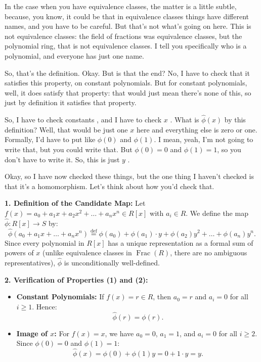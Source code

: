 \begin{proofWrapper}
\begin{speech}[00:10:45 - 00:12:20]
In the case when you have equivalence classes, the matter is a little subtle, because, you know, it could be that in equivalence classes things have different names, and you have to be careful. But that's not what's going on here. This is not equivalence classes: the field of fractions was equivalence classes, but the polynomial ring, that is not equivalence classes. I tell you specifically who is a polynomial, and everyone has just one name.

So, that's the definition. Okay. But is that the end? No, I have to check that it satisfies this property, on constant polynomials. But for constant polynomials, well, it does satisfy that property: that would just mean there's none of this, so just by definition it satisfies that property.

So, I have to check constants , and I have to check $x$ . What is $\hat{\phi}(x)$ by this definition? Well, that would be just one $x$ here and everything else is zero or one. Formally, I'd have to put like $\phi(0)$ and $\phi(1)$. I mean, yeah, I'm not going to write that, but you could write that. But $\phi(0) = 0$ and $\phi(1) = 1$, so you don't have to write it. So, this is just $y$ .

Okay, so I have now checked these things, but the one thing I haven't checked is that it's a homomorphism. Let's think about how you'd check that.
\end{speech}

\begin{content}
\textbf{1. Definition of the Candidate Map:}
Let $f(x) = a_0 + a_1 x + a_2 x^2 + \dots + a_n x^n \in R[x]$ with $a_i \in R$. We define the map $\hat{\phi} \colon R[x] \to S$ by:
\begin{equation}\label{eq:phi-hat-def}
\hat{\phi}(a_0 + a_1 x + \dots + a_n x^n) \stackrel{\text{def}}{=} \phi(a_0) + \phi(a_1) \cdot y + \phi(a_2) y^2 + \dots + \phi(a_n) y^n.
\end{equation}
Since every polynomial in $R[x]$ has a unique representation as a formal sum of powers of $x$ (unlike equivalence classes in $\operatorname{Frac}(R)$, there are no ambiguous representatives), $\hat{\phi}$ is unconditionally well-defined.

\textbf{2. Verification of Properties \textbf{(1)} and \textbf{(2)}:}
\begin{itemize}
    \item \textbf{Constant Polynomials:} If $f(x) = r \in R$, then $a_0 = r$ and $a_i = 0$ for all $i \ge 1$. Hence:
    \[
    \hat{\phi}(r) = \phi(r).
    \]
    \item \textbf{Image of $x$:} For $f(x) = x$, we have $a_0 = 0$, $a_1 = 1$, and $a_i = 0$ for all $i \ge 2$. Since $\phi(0) = 0$ and $\phi(1) = 1$:
    \[
    \hat{\phi}(x) = \phi(0) + \phi(1) y = 0 + 1 \cdot y = y.
    \]
\end{itemize}
\end{content}


\end{proofWrapper}
